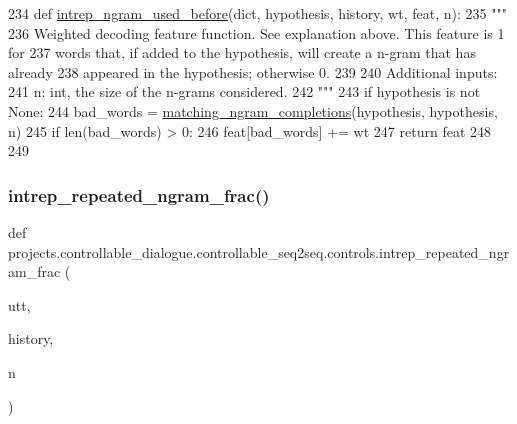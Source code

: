 \begin{DoxyCode}
234 \textcolor{keyword}{def }\hyperlink{namespaceprojects_1_1controllable__dialogue_1_1controllable__seq2seq_1_1controls_a96e1d28cd5e6769d118b0b8b339213e9}{intrep\_ngram\_used\_before}(dict, hypothesis, history, wt, feat, n):
235     \textcolor{stringliteral}{"""}
236 \textcolor{stringliteral}{    Weighted decoding feature function. See explanation above. This feature is 1 for}
237 \textcolor{stringliteral}{    words that, if added to the hypothesis, will create a n-gram that has already}
238 \textcolor{stringliteral}{    appeared in the hypothesis; otherwise 0.}
239 \textcolor{stringliteral}{}
240 \textcolor{stringliteral}{    Additional inputs:}
241 \textcolor{stringliteral}{      n: int, the size of the n-grams considered.}
242 \textcolor{stringliteral}{    """}
243     \textcolor{keywordflow}{if} hypothesis \textcolor{keywordflow}{is} \textcolor{keywordflow}{not} \textcolor{keywordtype}{None}:
244         bad\_words = \hyperlink{namespaceprojects_1_1controllable__dialogue_1_1controllable__seq2seq_1_1controls_ab562827e4a16578079aa8121ebadcda7}{matching\_ngram\_completions}(hypothesis, hypothesis, n)
245         \textcolor{keywordflow}{if} len(bad\_words) > 0:
246             feat[bad\_words] += wt
247     \textcolor{keywordflow}{return} feat
248 
249 
\end{DoxyCode}
\mbox{\label{namespaceprojects_1_1controllable__dialogue_1_1controllable__seq2seq_1_1controls_afeb51a7c1798dbff5427d5ddec3d735c}} 
\subsubsection{\texorpdfstring{intrep\+\_\+repeated\+\_\+ngram\+\_\+frac()}{intrep\_repeated\_ngram\_frac()}}
{\footnotesize\ttfamily def projects.\+controllable\+\_\+dialogue.\+controllable\+\_\+seq2seq.\+controls.\+intrep\+\_\+repeated\+\_\+ngram\+\_\+frac (\begin{DoxyParamCaption}\item[{}]{utt,  }\item[{}]{history,  }\item[{}]{n }\end{DoxyParamCaption})}

